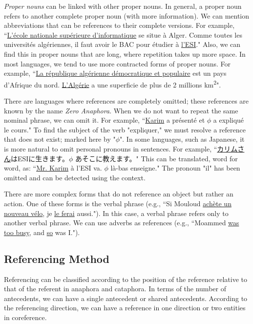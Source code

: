\documentclass{KBook}
\begin{document}
\textit{Proper nouns} can be linked with other proper nouns. In general, a proper noun refers to another complete proper noun (with more information). We can mention abbreviations that can be references to their complete versions. For example, ``\underline{L'école nationale supérieure d'informatique} se situe à Alger. Comme toutes les universités algériennes, il faut avoir le BAC pour étudier à \underline{l'ESI}." Also, we can find this in proper nouns that are long, where repetition takes up more space. In most languages, we tend to use more contracted forms of proper nouns. For example, ``\underline{La république algérienne démocratique et populaire} est un pays d'Afrique du nord. \underline{L'Algérie} a une superficie de plus de 2 millions km\textsuperscript{2}".

There are languages where references are completely omitted; these references are known by the name \textit{Zero Anaphora}. When we do not want to repeat the same nominal phrase, we can omit it. For example, ``\underline{Karim} a présenté et \underline{$ \phi $} a expliqué le cours." To find the subject of the verb "expliquer," we must resolve a reference that does not exist; marked here by "$ \phi $". In some languages, such as Japanese, it is more natural to omit personal pronouns in sentences. For example, ``\underline{カリムさん}はESIに生きます。\underline{$ \phi $} あそこに教えます。" This can be translated, word for word, as: ``\underline{Mr. Karim} à l'ESI va. \underline{$ \phi $} là-bas enseigne." The pronoun "il" has been omitted and can be detected using the context.

There are more complex forms that do not reference an object but rather an action. One of these forms is the verbal phrase (e.g., ``Si Mouloud \underline{achète un nouveau vélo}, je \underline{le ferai} aussi."). In this case, a verbal phrase refers only to another verbal phrase. We can use adverbs as references (e.g., ``Moammed \underline{was too busy}, and \underline{so} was I.").



\subsection{Referencing Method}

Referencing can be classified according to the position of the reference relative to that of the referent in anaphora and cataphora. In terms of the number of antecedents, we can have a single antecedent or shared antecedents. According to the referencing direction, we can have a reference in one direction or two entities in coreference.
\end{document}
